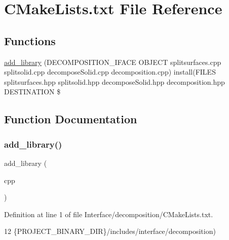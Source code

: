 \hypertarget{Interface_2decomposition_2CMakeLists_8txt}{}\section{C\+Make\+Lists.\+txt File Reference}
\label{Interface_2decomposition_2CMakeLists_8txt}
\subsection*{Functions}
\begin{DoxyCompactItemize}
\item 
\hyperlink{Interface_2decomposition_2CMakeLists_8txt_a047e6f2690a4ac18aa07880b440583df}{add\+\_\+library} (D\+E\+C\+O\+M\+P\+O\+S\+I\+T\+I\+O\+N\+\_\+\+I\+F\+A\+CE O\+B\+J\+E\+CT splitsurfaces.\+cpp splitsolid.\+cpp decompose\+Solid.\+cpp decomposition.\+cpp) install(F\+I\+L\+ES splitsurfaces.\+hpp splitsolid.\+hpp decompose\+Solid.\+hpp decomposition.\+hpp D\+E\+S\+T\+I\+N\+A\+T\+I\+ON \$
\end{DoxyCompactItemize}


\subsection{Function Documentation}
\mbox{\label{Interface_2decomposition_2CMakeLists_8txt_a047e6f2690a4ac18aa07880b440583df}} 
\subsubsection{\texorpdfstring{add\+\_\+library()}{add\_library()}}
{\footnotesize\ttfamily add\+\_\+library (\begin{DoxyParamCaption}\item[{D\+E\+C\+O\+M\+P\+O\+S\+I\+T\+I\+O\+N\+\_\+\+I\+F\+A\+CE O\+B\+J\+E\+CT splitsurfaces.\+cpp splitsolid.\+cpp decompose\+Solid.\+cpp decomposition.}]{cpp }\end{DoxyParamCaption})}



Definition at line 1 of file Interface/decomposition/\+C\+Make\+Lists.\+txt.


\begin{DoxyCode}
12                \{PROJECT\_BINARY\_DIR\}/includes/interface/decomposition)
\end{DoxyCode}
